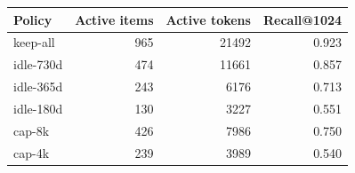 \begin{tabular}{@{}lrrr@{}}\toprule
Policy & Active items & Active tokens & Recall@1024 \\\midrule
keep-all & 965 & 21492 & 0.923 \\
idle-730d & 474 & 11661 & 0.857 \\
idle-365d & 243 & 6176 & 0.713 \\
idle-180d & 130 & 3227 & 0.551 \\
cap-8k & 426 & 7986 & 0.750 \\
cap-4k & 239 & 3989 & 0.540 \\
\bottomrule\end{tabular}